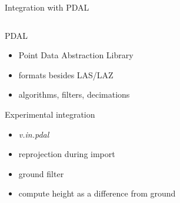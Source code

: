\documentclass[xcolor={dvipsnames,usenames},beamer,aspectratio=169]{beamer}
\newcommand{\module}[1]{\emph{#1}}
\begin{document}
\begin{frame}{Integration with PDAL}

\begin{columns}
\begin{column}{0.5\textwidth}

\begin{block}{PDAL}
 \begin{itemize}
  \item Point Data Abstraction Library
  \item formats besides LAS/LAZ
  \item algorithms, filters, decimations
 \end{itemize}
\end{block}

\begin{block}{Experimental integration}
 \begin{itemize}
  \item \module{v.in.pdal}
  \item reprojection during import
  \item ground filter
  \item compute height as a difference from ground
 \end{itemize}
\end{block}

\end{column}
\begin{column}{0.25\textwidth}


\end{column}
\end{columns}
\end{frame}
\end{document}
